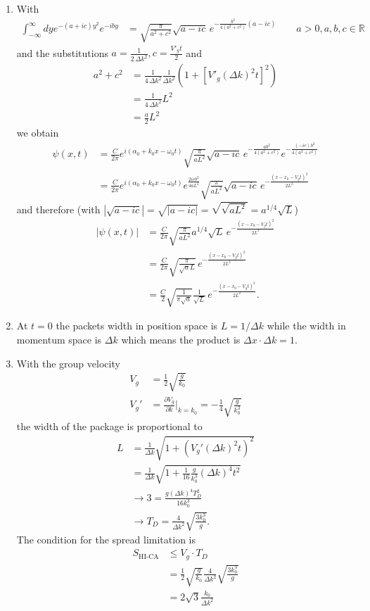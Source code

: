 \documentclass[10pt,a4paper]{article}
\theoremstyle{definition}
\begin{document}
\begin{enumerate}[label=(\alph*)]
\item With
\begin{align}
    \int_{-\infty}^\infty dy e^{-(a+ic)y^2}e^{-iby}
    &=\sqrt{\frac{\pi}{a^2+c^2}}\sqrt{a-ic}\,e^{-\frac{b^2}{4(a^2+c^2)}(a-ic)}\qquad a>0, a,b,c\in\mathbb{R}
\end{align}
and the substitutions $a=\frac{1}{2\,\Delta k^2}, c=\frac{V'_gt}{2}$ and 
\begin{align}
    a^2+c^2&=\frac{1}{4\,\Delta k^2}\frac{1}{\Delta k^2}\left(1+[V'_g(\Delta k)^2t]^2\right)\\
    &=\frac{1}{4\,\Delta k^2}L^2\\
    &=\frac{a}{2}L^2
\end{align}
we obtain
\begin{align}
   \psi(x,t)
   &=\frac{C}{2\pi}e^{i(\alpha_0+k_0x-\omega_0t)}\sqrt{\frac{\pi }{aL^2}}\sqrt{a-ic}\,e^{-\frac{ab^2}{4(a^2+c^2)}}e^{-\frac{(-ic)b^2}{4(a^2+c^2)}}\\
   &=\frac{C}{2\pi}e^{i(\alpha_0+k_0x-\omega_0t)}e^{\frac{2icb^2}{4aL^2}}\sqrt{\frac{\pi }{aL^2}}\sqrt{a-ic}\,e^{-\frac{(x-x_0-V_gt)^2}{2L^2}}
\end{align}
and therefore (with $|\sqrt{a-ic}|=\sqrt{|a-ic|}=\sqrt{\sqrt{aL^2}}=a^{1/4}\sqrt{L}$)
\begin{align}
   |\psi(x,t)|
    &=\frac{C}{2\pi}\sqrt{\frac{\pi }{aL^2}}a^{1/4}\sqrt{L}\,e^{-\frac{(x-x_0-V_gt)^2}{2L^2}}\\
    &=\frac{C}{2\pi}\sqrt{\frac{\pi }{\sqrt{a}L}}\,e^{-\frac{(x-x_0-V_gt)^2}{2L^2}}\\
    &=\frac{C}{2}\sqrt{\frac{1 }{\pi\sqrt{a}}}\frac{1}{\sqrt{L}}\,e^{-\frac{(x-x_0-V_gt)^2}{2L^2}}.
\end{align}
\item At $t=0$ the packets width in position space is $L=1/\Delta k$ while the width in momentum space is $\Delta k$ which means the product is $\Delta x \cdot \Delta k = 1$.
\item With the group velocity
\begin{align}
    V_g&=\frac{1}{2}\sqrt{\frac{g}{k_0}}\\
    V_g'&=\frac{\partial V_g}{\partial k}|_{k=k_0}=-\frac{1}{4}\sqrt{\frac{g}{k_0^3}}
\end{align}
the width of the package is proportional to
\begin{align}
    L&=\frac{1}{\Delta k}\sqrt{1+\left(V_g'(\Delta k)^2t\right)^2}\\
    &=\frac{1}{\Delta k}\sqrt{1+\frac{1}{16}\frac{g}{k_0^3}(\Delta k)^4t^2}\\
    &\rightarrow 3 = \frac{g(\Delta k)^4T_D^2}{16k_0^3}\\
    &\rightarrow T_D=\frac{4}{\Delta k^2}\sqrt{\frac{3k_0^3}{g}}.
\end{align}
The condition for the spread limitation is
\begin{align}
    S_\text{HI-CA}&\le V_g\cdot T_D\\
    &=\frac{1}{2}\sqrt{\frac{g}{k_0}}\frac{4}{\Delta k^2}\sqrt{\frac{3k_0^3}{g}}\\
    &=2\sqrt{3}\frac{k_0}{\Delta k^2}
\end{align}
\end{enumerate}
\end{document}

